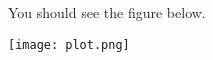 \documentclass{article}
\begin{document}
You should see the figure below.

\texttt{[image: plot.png]}
\end{document}
